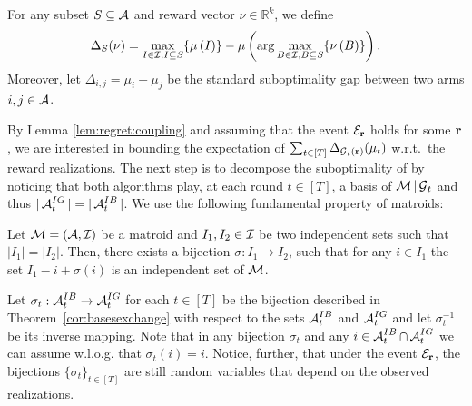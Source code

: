 \begin{definition}[Gaps]\label{def:gaps}
For any subset $S \subseteq \operatorname{\mathcal{A}}$ and reward vector $\nu \in \mathbb{R}^k$, we define 
\begin{align*}
\Delta_S(\nu) = \max_{I \in \operatorname{\mathcal{I}}, I \subseteq S}\{\mu\left(I\right)\}  - \mu\left(\arg\max_{B \in \operatorname{\mathcal{I}}, B \subseteq S}\{\nu\left(B\right)\}\right).
\end{align*}
Moreover, let $\Delta_{i,j} = \mu_i - \mu_{j}$ be the standard suboptimality gap between two arms $i,j \in \operatorname{\mathcal{A}}$.
\end{definition}

By Lemma \ref{lem:regret:coupling} and assuming that the event $\mathcal{E}_{\operatorname{\mathbf{r}}}$ holds for some $\operatorname{\mathbf{r}}$, we are interested in bounding the expectation of $\sum_{t \in [T]} \Delta_{\operatorname{\mathcal{G}}_t(\operatorname{\mathbf{r}})}(\bar\mu_t)$ w.r.t.\ the reward realizations. The next step is to decompose the suboptimality of \UCB by noticing that both algorithms play, at each round $t \in [T]$, a basis of $\operatorname{\mathcal{M}}|\operatorname{\mathcal{G}}_t$ and thus $|\operatorname{\mathcal{A}}^{IG}_t| = |\operatorname{\mathcal{A}}^{IB}_t|$. We use the following fundamental property of matroids:

\begin{theorem}\label{cor:basesexchange} Let $\operatorname{\mathcal{M}} = (\operatorname{\mathcal{A}},\operatorname{\mathcal{I}})$ be a matroid and $I_1, I_2 \in \operatorname{\mathcal{I}}$ be two independent sets such that $|I_1| = |I_2|$. Then, there exists a bijection $\sigma : I_1 \rightarrow I_2$, such that for any $i \in I_1$ the set $I_1 - i + \sigma(i)$ is an independent set of $\operatorname{\mathcal{M}}$. 
\end{theorem}

Let $\sigma_t: \operatorname{\mathcal{A}}^{IB}_t \rightarrow \operatorname{\mathcal{A}}_t^{IG}$ for each $t \in [T]$ be the bijection described in Theorem~\ref{cor:basesexchange} with respect to the sets $\operatorname{\mathcal{A}}^{IB}_t$ and $\operatorname{\mathcal{A}}^{IG}_t$ and let $\sigma_t^{-1}$ be its inverse mapping. 
Note that in any bijection $\sigma_t$ and any $i \in \operatorname{\mathcal{A}}^{IB}_t \cap \operatorname{\mathcal{A}}^{IG}_t$ we can assume w.l.o.g. that $\sigma_t(i) = i$. Notice, further, that under the event $\mathcal{E}_{\operatorname{\mathbf{r}}}$, the bijections $\{\sigma_t\}_{t \in [T]}$ are still random variables that depend on the observed realizations. 

